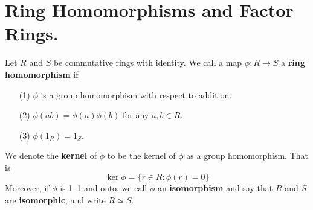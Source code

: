
\section{Ring Homomorphisms and Factor Rings.}

\begin{definition}
    Let $R$ and  $S$ be commutative rings with identity. We call a map
    $\phi:R \xrightarrow{} S$ a \textbf{ring homomorphism} if
    \begin{enumerate}
        \item[(1)] $\phi$ is a group homomorphism with respect to addition.

        \item[(2)] $\phi(ab)=\phi(a)\phi(b)$ for any $a,b \in R$.

        \item[(3)] $\phi(1_R)=1_S$.
    \end{enumerate}
    We denote the \textbf{kernel} of $\phi$ to be the kernel of $\phi$ as a
    group homomorphism. That is
    \begin{equation*}
        \ker{\phi}=\{r \in R : \phi(r)=0\}
    \end{equation*}
    Moreover, if $\phi$ is 1--1 and onto, we call $\phi$ an \textbf{isomorphism}
    and say that $R$ and $S$ are \textbf{isomorphic}, and write $R \simeq S$.
\end{definition}

